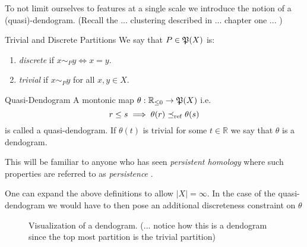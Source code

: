 To not limit ourselves to features at a single scale we introduce the notion of a (quasi)-dendogram. 
(Recall the ... clustering described in ... chapter one ... \todo)

\begin{definition}{Trivial and Discrete Partitions}{}
We say that $P \in \P(X)$ is:
\begin{enumerate}
    \item \emph{discrete} if $x \sim_P y \iff x = y$.
    \item \emph{trivial} if $x \sim_P y$ for all $x,y \in X$.
\end{enumerate}
\end{definition}

\begin{definition}{Quasi-Dendogram}{}
A montonic map $\theta: \R_{\leq0} \to \mathfrak{P}(X)$ i.e.
\begin{equation*}
    r \leq s \implies  \theta(r) \refines \theta(s)
\end{equation*}
is called a quasi-dendogram. If $\theta(t)$ is trivial for some $t \in \mathbb{R}$ we say that $\theta$ is a dendogram.
\end{definition}

This will be familiar to anyone who has seen \emph{persistent homology} where such properties are referred to as \emph{persistence} \source. 

\begin{myremark}{}{}
\source One can expand the above definitions to allow $|X| = \infty$. 
In the case of the quasi-dendogram we would have to then pose an additional discreteness constraint on $\theta$
\end{myremark}

\begin{figure}
    \centering
    \caption{\todo Visualization of a dendogram. (... notice how this is a dendogram since the top most partition is the trivial partition)}
    \label{fig:enter-label}
\end{figure}

